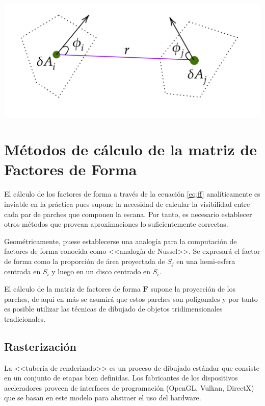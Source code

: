 \vspace{5mm}
\begin{minipage}[h]{0.8\linewidth}
	\centering
	\includegraphics[width=0.8\linewidth]{assets/formfactors}
	\label{img:ff}
\end{minipage}

\section{Métodos de cálculo de la matriz de Factores de Forma}
\label{sec:calculoff}

El cálculo de los factores de forma a través de la ecuación \eqref{eq:ff} analíticamente es inviable en la práctica pues supone la necesidad de calcular la visibilidad entre cada par de parches que componen la escana. Por tanto, es necesario establecer otros métodos que provean aproximaciones lo suficientemente correctas.

Geométricamente, puese establecerse una analogía para la computación de factores de forma conocida como <<analogía de Nussel>>. Se expresará el factor de forma como la proporción de área proyectada de $S_{j}$ en una hemi-esfera centrada en $S_{i}$ y luego en un disco centrado en $S_{i}$.

El cálculo de la matriz de factores de forma $\mathbf{F}$ supone la proyección de los parches, de aquí en más se asumirá que estos parches son poligonales y por tanto es posible utilizar las técnicas de dibujado de objetos tridimensionales tradicionales.

\subsection{Rasterización}

La <<tubería de renderizado>> es un proceso de dibujado estándar que consiste en un conjunto de etapas bien definidas. Los fabricantes de los dispositivos aceleradores proveen de interfaces de programación (OpenGL, Vulkan, DirectX) que se basan en este modelo para abstraer el uso del hardware.

